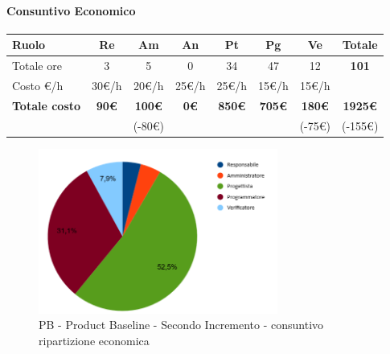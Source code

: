 \paragraph{Consuntivo Economico}
\begin{center}
	\renewcommand{\arraystretch}{1.8}
	\begin{tabular}{ |m{6em}|c|c|c|c|c|c|c| }
	\hline
	\textbf{Ruolo} & \textbf{Re} & \textbf{Am} &  \textbf{An} &  \textbf{Pt} &  \textbf{Pg} &  \textbf{Ve} &  \textbf{Totale}\\
    \hline
    Totale ore & 3 & 5 & 0 & 34 & 47 & 12 & \textbf{101}\\
    \hline
    Costo \euro/h & 30\euro/h & 20\euro/h & 25\euro/h & 25\euro/h & 15\euro/h & 15\euro/h & \\
    \hline
    \textbf{Totale costo} & \textbf{90\euro} & \textbf{100\euro} &  \textbf{0\euro} & \textbf{850\euro} &  \textbf{705\euro} &  \textbf{180\euro} &  \textbf{1925\euro} \\
    &  & (-80\euro) & & & & (-75\euro) & (-155\euro) \\
    \hline
	\end{tabular}

    \begin{figure}[H]
        \centering\includegraphics[width=0.7\textwidth, height=0.7\textheight, keepaspectratio]{images/consuntivo/consuntivo-PB-costo-secondo-incremento.png}
        \caption{PB - Product Baseline - Secondo Incremento - consuntivo ripartizione economica}
    \end{figure}
\end{center}

